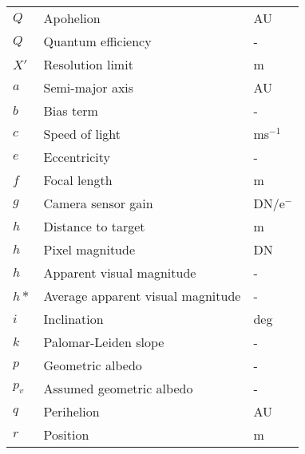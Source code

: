 \begin{table}[h!]
\begin{tabular}{lll}
$Q$               & Apohelion                         & AU                                                                       \\
$Q$               & Quantum efficiency                & -                                                                        \\
$X'$              & Resolution limit                  & m                                                                        \\
$a$               & Semi-major axis                   & AU                                                                       \\
$b$               & Bias term                         & -                                                                        \\
$c$               & Speed of light                    & ms$^{-1}$                                                                      \\
$e$               & Eccentricity                      & -                                                                        \\
$f$               & Focal length                      & m                                                                        \\
$g$               & Camera sensor gain                & DN/e$^-$                                                                        \\
$h$               & Distance to target                & m                                                                        \\
$h$               & Pixel magnitude                   & DN                                                                       \\
$h$               & Apparent visual magnitude         & -                                                                        \\
$h*$              & Average apparent visual magnitude & -                                                                        \\
$i$               & Inclination                       & deg                                                                      \\
$k$               & Palomar-Leiden slope              & -                                                                        \\
$p$               & Geometric albedo                  & -                                                                        \\
$p_v$            & Assumed geometric albedo          & -                                                                        \\
$q$               & Perihelion                        & AU                                                                       \\
$r$               & Position                          & m                                                                       
\end{tabular}
\end{table}
\newpage
